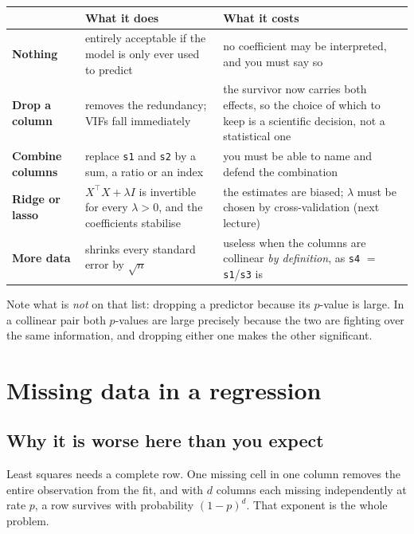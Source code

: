 \documentclass[11pt]{article}
\newcommand{\Xt}{X^{\!\top}}
\begin{document}
\begin{center}
\begin{tabular}{@{}lp{4.9cm}p{5.0cm}@{}}
\toprule
& \textbf{What it does} & \textbf{What it costs}\\
\midrule
\textbf{Nothing} & entirely acceptable if the model is only ever used to
  predict & no coefficient may be interpreted, and you must say so\\[4pt]
\textbf{Drop a column} & removes the redundancy; VIFs fall immediately &
  the survivor now carries both effects, so the choice of which to keep is a
  scientific decision, not a statistical one\\[4pt]
\textbf{Combine columns} & replace \texttt{s1} and \texttt{s2} by a sum, a
  ratio or an index & you must be able to name and defend the combination\\[4pt]
\textbf{Ridge or lasso} & $\Xt X + \lambda I$ is invertible for every
  $\lambda>0$, and the coefficients stabilise &
  the estimates are biased; $\lambda$ must be chosen by cross-validation
  (next lecture)\\[4pt]
\textbf{More data} & shrinks every standard error by $\sqrt{n}$ &
  useless when the columns are collinear \emph{by definition}, as
  \texttt{s4} $=$ \texttt{s1}/\texttt{s3} is\\
\bottomrule
\end{tabular}
\end{center}

Note what is \emph{not} on that list: dropping a predictor because its
$p$-value is large. In a collinear pair both $p$-values are large precisely
because the two are fighting over the same information, and dropping either
one makes the other significant.

\notesources{\AMLUnitVSources}

\section{Missing data in a regression}
\label{sec:missing}

\subsection{Why it is worse here than you expect}

Least squares needs a complete row. One missing cell in one column removes the
entire observation from the fit, and with $d$ columns each missing
independently at rate $p$, a row survives with probability $(1-p)^d$. That
exponent is the whole problem.
\end{document}

